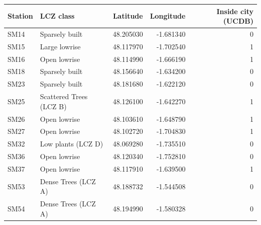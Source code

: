 \begin{tabular}{llrrr}
\toprule
Station & LCZ class & Latitude & Longitude & Inside city (UCDB) \\
\midrule
SM14 & Sparsely built & 48.205030 & -1.681340 & 0 \\
SM15 & Large lowrise & 48.117970 & -1.702540 & 1 \\
SM16 & Open lowrise & 48.114990 & -1.666190 & 1 \\
SM18 & Sparsely built & 48.156640 & -1.634200 & 0 \\
SM23 & Sparsely built & 48.181680 & -1.622120 & 0 \\
SM25 & Scattered Trees (LCZ B) & 48.126100 & -1.642270 & 1 \\
SM26 & Open lowrise & 48.103610 & -1.648790 & 1 \\
SM27 & Open lowrise & 48.102720 & -1.704830 & 1 \\
SM32 & Low plants (LCZ D) & 48.069280 & -1.735510 & 0 \\
SM36 & Open lowrise & 48.120340 & -1.752810 & 0 \\
SM37 & Open lowrise & 48.117910 & -1.639500 & 1 \\
SM53 & Dense Trees (LCZ A) & 48.188732 & -1.544508 & 0 \\
SM54 & Dense Trees (LCZ A) & 48.194990 & -1.580328 & 0 \\
\bottomrule
\end{tabular}
